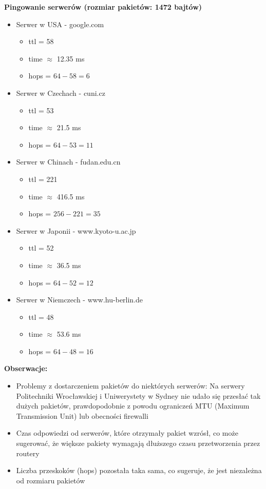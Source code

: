\documentclass{article}
\begin{document}
\textbf{Pingowanie serwerów (rozmiar pakietów: 1472 bajtów)}
\vspace{1\baselineskip}
\begin{itemize}

    \item Serwer w USA - google.com
    \begin{itemize}
        \item ttl = 58
        \item time $\approx$ 12.35 ms
        \item hops = $64 - 58 = 6$
    \end{itemize}

    \item Serwer w Czechach - cuni.cz 
    \begin{itemize}
        \item ttl = 53
        \item time $\approx$ 21.5 ms
        \item hops = $64 - 53 = 11$
    \end{itemize} 
    \item Serwer w Chinach - fudan.edu.cn 
    \begin{itemize}
        \item ttl = 221
        \item time $\approx$ 416.5 ms
        \item hops = $256 - 221 = 35$
    \end{itemize}
    \item Serwer w Japonii - www.kyoto-u.ac.jp
    \begin{itemize}
        \item ttl = 52
        \item time $\approx$ 36.5 ms
        \item hops = $64 - 52 = 12$
    \end{itemize}
    \item Serwer w Niemczech - www.hu-berlin.de
    \begin{itemize}
        \item ttl = 48
        \item time $\approx$ 53.6 ms
        \item hops = $64 - 48 = 16$
    \end{itemize}
\end{itemize}
\vspace{1\baselineskip}
\textbf{Obserwacje: }
\vspace{1\baselineskip}
\begin{itemize}
    \item Problemy z dostarczeniem pakietów do niektórych serwerów: Na serwery Politechniki Wrocławskiej i Uniwerystety w Sydney nie udało
    się przesłać tak dużych pakietów, prawdopodobnie z powodu ograniczeń MTU (Maximum Transmission Unit) lub obecności firewalli
    \item Czas odpowiedzi od serwerów, które otrzymały pakiet wzrósł, co może sugerować, że większe pakiety wymagają dłuższego czasu
    przetworzenia przez routery
    \item Liczba przeskoków (hops) pozostała taka sama, co sugeruje, że jest niezależna od rozmiaru pakietów
\end{itemize}
\end{document}

